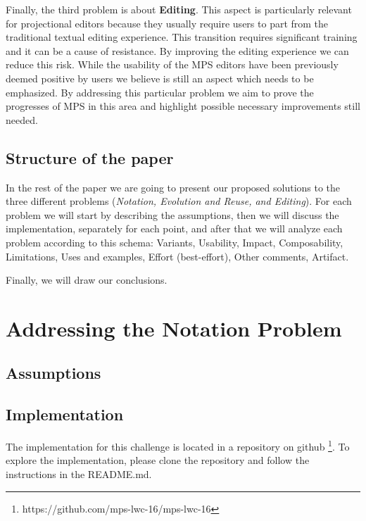 \documentclass[preprint,numbers,10pt]{sigplanconf}
\begin{document}
Finally, the third problem is about \textbf{Editing}. This aspect is particularly relevant for projectional editors because they usually require users to part from the traditional textual editing experience. This transition requires significant training and it can be a cause of resistance. By improving the editing experience we can reduce this risk. While the usability of the MPS editors have been previously deemed positive by users \cite{Voelter2014} we believe is still an aspect which needs to be emphasized. By addressing this particular problem we aim to prove the progresses of MPS in this area and highlight possible necessary improvements still needed.

\subsection{Structure of the paper}

In the rest of the paper we are going to present our proposed solutions to the three different problems (\emph{Notation, Evolution and Reuse, and Editing}). For each problem we will start by describing the assumptions, then we will discuss the implementation, separately for each point, and after that we will analyze each problem according to this schema: Variants, Usability, Impact, Composability, Limitations, Uses and examples, Effort (best-effort), Other comments, Artifact.

Finally, we will draw our conclusions.

%
%

\section{Addressing the Notation Problem}

\subsection{Assumptions}

\subsection{Implementation}
The implementation for this challenge is located in a repository on github \footnote{https://github.com/mps-lwc-16/mps-lwc-16}. To explore the implementation, please clone the repository and follow the instructions in the README.md.
\end{document}
